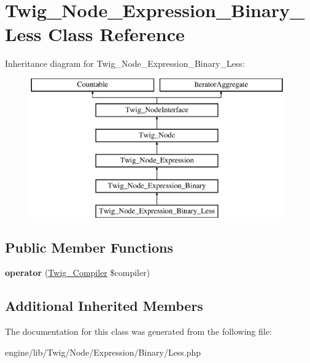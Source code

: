 \hypertarget{class_twig___node___expression___binary___less}{}\section{Twig\+\_\+\+Node\+\_\+\+Expression\+\_\+\+Binary\+\_\+\+Less Class Reference}
\label{class_twig___node___expression___binary___less}
Inheritance diagram for Twig\+\_\+\+Node\+\_\+\+Expression\+\_\+\+Binary\+\_\+\+Less\+:\begin{figure}[H]
\begin{center}
\leavevmode
\includegraphics[height=6.000000cm]{class_twig___node___expression___binary___less}
\end{center}
\end{figure}
\subsection*{Public Member Functions}
\begin{DoxyCompactItemize}
\item 
\hypertarget{class_twig___node___expression___binary___less_af77318ec88d5f8a508684970a150b670}{}{\bfseries operator} (\hyperlink{class_twig___compiler}{Twig\+\_\+\+Compiler} \$compiler)\label{class_twig___node___expression___binary___less_af77318ec88d5f8a508684970a150b670}

\end{DoxyCompactItemize}
\subsection*{Additional Inherited Members}


The documentation for this class was generated from the following file\+:\begin{DoxyCompactItemize}
\item 
engine/lib/\+Twig/\+Node/\+Expression/\+Binary/Less.\+php\end{DoxyCompactItemize}
